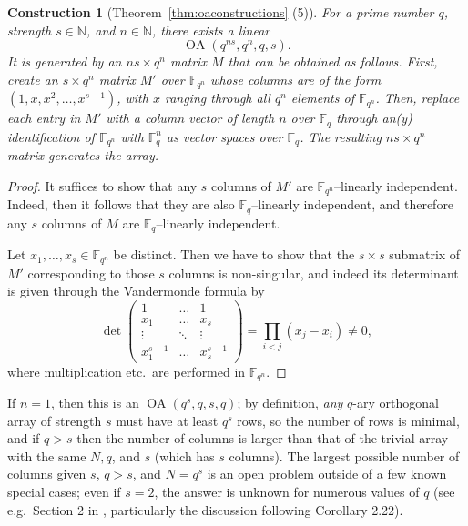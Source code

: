 \documentclass[11pt, letterpaper]{article}
\newtheorem{construction}{Construction}
\theoremstyle{definition}
\theoremstyle{remark}
\DeclareMathOperator{\OA}{OA}
\newcommand{\N}{\mathbb{N}}
\begin{document}
\begin{appendices}
\begin{construction}[Theorem~\ref{thm:oaconstructions} (5)]
    For a prime number $q$, strength $s \in \N$, and $n\in \N$, there exists a linear \[
    \OA \left( q^{ns}, q^n, q, s\right).
    \] It is generated by an $ns \times q^n$ matrix $M$ that can be obtained as follows. First, create an $s \times q^n$ matrix $M'$ over $\mathbb{F}_{q^n}$ whose columns are of the form $(1,x,x^2,\ldots, x^{s-1})$, with $x$ ranging through all $q^n$ elements of $\mathbb{F}_{q^n}$. Then, replace each entry in $M'$ with a column vector of length $n$ over $\mathbb{F}_q$ through an(y) identification of $\mathbb{F}_{q^n}$ with $\mathbb{F}_q^n$ as vector spaces over $\mathbb{F}_q$. The resulting $ns \times q^n$ matrix generates the array.
\end{construction}
\begin{proof}
    It suffices to show that any $s$ columns of $M'$ are $\mathbb{F}_{q^n}$--linearly independent. Indeed, then it follows that they are also $\mathbb{F}_q$--linearly independent, and therefore any $s$ columns of $M$ are $\mathbb{F}_q$--linearly independent.

    Let $x_1,\ldots,x_s \in \mathbb{F}_{q^n}$ be distinct. Then we have to show that the $s \times s$ submatrix of $M'$ corresponding to those $s$ columns is non-singular, and indeed its determinant is given through the Vandermonde formula by \[
    \det \begin{pmatrix}
        1 & \ldots & 1\\
        x_1 & \ldots & x_s\\
        \vdots & \ddots & \vdots \\
        x_1^{s-1} & \ldots & x_s^{s-1}
    \end{pmatrix}
    = \prod_{i < j} (x_j - x_i) \neq 0,
    \] where multiplication etc.\ are performed in $\mathbb{F}_{q^n}$.
\end{proof}

If $n=1$, then this is an $\OA(q^s,q,s,q)$; by definition, \emph{any} $q$-ary orthogonal array of strength $s$ must have at least $q^s$ rows, so the number of rows is minimal, and if $q > s$ then the number of columns is larger than that of the trivial array with the same $N,q$, and $s$ (which has $s$ columns). The largest possible number of columns given $s$, $q>s$, and $N=q^s$ is an open problem outside of a few known special cases; even if $s=2$, the answer is unknown for numerous values of $q$ (see e.g.\ Section 2 in \cite{hedayat2012}, particularly the discussion following Corollary 2.22).


\end{appendices}
\end{document}
